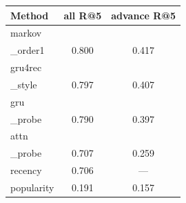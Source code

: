 \begin{tabular}{lcc}
\toprule
Method & all R@5 & advance R@5 \\
\midrule
markov\\_order1 & 0.800 & 0.417 \\
gru4rec\\_style & 0.797 & 0.407 \\
gru\\_probe & 0.790 & 0.397 \\
attn\\_probe & 0.707 & 0.259 \\
recency & 0.706 & — \\
popularity & 0.191 & 0.157 \\
\bottomrule
\end{tabular}
